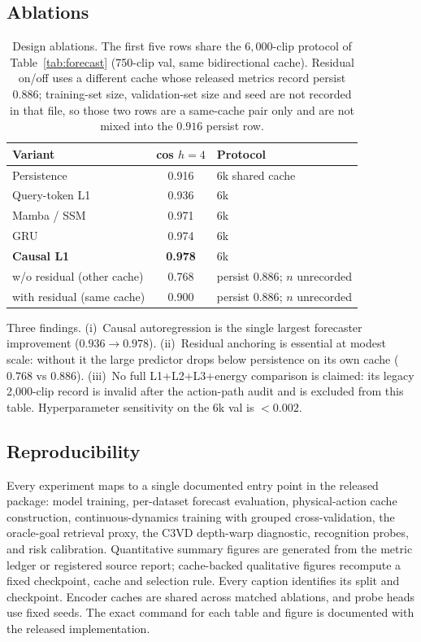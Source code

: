 \documentclass[preprint,12pt]{elsarticle}
\begin{document}
\FloatBarrier

\subsection{Ablations}
\label{sec:ablation}

\begin{table}[t]
\centering
\caption{Design ablations.
The first five rows share the $6{,}000$-clip protocol of Table~\ref{tab:forecast}
(750-clip val, same bidirectional cache). Residual on/off uses a different
cache whose released metrics record persist $0.886$; training-set size,
validation-set size and seed are not recorded in that file, so those two rows
are a same-cache pair only and are not mixed into the $0.916$ persist row.}
\label{tab:ablation}
\small
\begin{tabular}{lcl}
\toprule
Variant & cos $h{=}4$ & Protocol \\
\midrule
Persistence & 0.916 & 6k shared cache \\
Query-token L1 & 0.936 & 6k \\
Mamba / SSM & 0.971 & 6k \\
GRU & 0.974 & 6k \\
\textbf{Causal L1} & \textbf{0.978} & 6k \\
\quad w/o residual (other cache) & 0.768 & persist $0.886$; $n$ unrecorded \\
\quad with residual (same cache) & 0.900 & persist $0.886$; $n$ unrecorded \\
\bottomrule
\end{tabular}
\end{table}

Three findings.
(i)~Causal autoregression is the single largest forecaster improvement ($0.936\to0.978$).
(ii)~Residual anchoring is essential at modest scale: without it the large predictor drops below persistence on its own cache ($0.768$ vs $0.886$).
(iii)~No full L1{+}L2{+}L3{+}energy comparison is claimed: its legacy
2,000-clip record is invalid after the action-path audit and is excluded from
this table.
Hyperparameter sensitivity on the 6k val is ${<}0.002$.

\subsection{Reproducibility}
\label{sec:reproducibility}
Every experiment maps to a single documented entry point in the released
package: model training, per-dataset forecast evaluation, physical-action
cache construction, continuous-dynamics training with grouped
cross-validation, the oracle-goal retrieval proxy, the C3VD depth-warp
diagnostic, recognition probes, and risk calibration. Quantitative summary figures are generated from
the metric ledger or registered source report; cache-backed qualitative figures
recompute a fixed checkpoint, cache and selection rule. Every caption
identifies its split and checkpoint. Encoder caches are shared across matched
ablations, and probe heads use fixed seeds.
The exact command for each table and figure is documented with the released
implementation.
\end{document}
